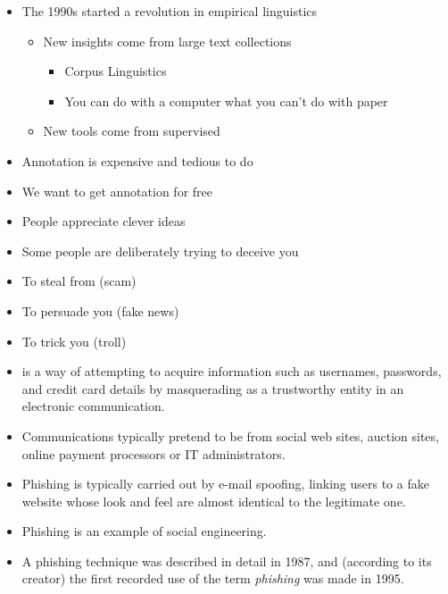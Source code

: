 \documentclass[a4paper,landscape,headrule,footrule,xetex]{foils}
\begin{document}
\MyLogo{}
\begin{itemize}
\item The 1990s started a revolution in empirical linguistics
  \begin{itemize}
  \item New insights come from  large text collections
    \begin{itemize}
    \item Corpus Linguistics
    \item You can do with a computer what you can't do with paper
    \end{itemize}
  \item New tools come from supervised 
  \end{itemize}
\item Annotation is expensive and tedious to do
\item We want to get annotation for free
\item People appreciate clever ideas
\end{itemize}




\begin{itemize}
\item Some people are deliberately trying to deceive you
\item To steal from (scam)
\item To persuade you (fake news)
\item To trick you (troll)
\end{itemize}


\begin{itemize}
\item {} is a way of attempting to acquire information
  such as usernames, passwords, and credit card details by
  masquerading as a trustworthy entity in an electronic communication.
\item Communications typically pretend to be from social web sites, auction sites, online payment processors or IT administrators.
\item Phishing is typically carried out by e-mail spoofing, linking
  users to a fake website whose look and feel are almost identical
  to the legitimate one.
\item Phishing is an example of social engineering.
\item A phishing technique was described in detail in 1987, and (according to its creator) the first recorded use of the term \textit{phishing} was made in 1995.
\end{itemize}
\end{document}
